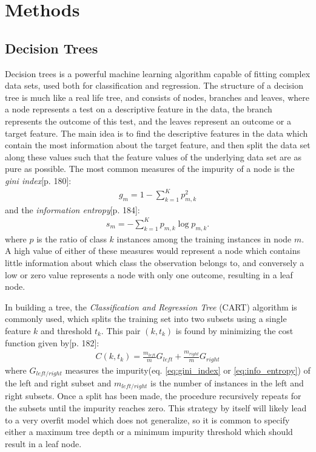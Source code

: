 \section{Methods}\label{sec:Methods}


\subsection{Decision Trees}
Decision trees is a powerful machine learning algorithm capable of fitting complex data sets, used both for classification and regression. The structure of a decision tree is much like a real life tree, and consists of nodes, branches and leaves, where a node represents a test on a descriptive feature in the data, the branch represents the outcome of this test, and the leaves represent an outcome or a target feature. The main idea is to find the descriptive features in the data which contain the most information about the target feature, and then split the data set along these values such that the feature values of the underlying data set are as pure as possible. The most common measures of the impurity of a node is the \textit{gini index}\cite{geron}[p. 180]:
\begin{align}
\label{eq:gini_index}
    g_m = 1 - \sum_{k=1}^K p_{m, k}^2
\end{align}
and the \textit{information entropy}\cite{geron}[p. 184]:
\begin{align}
\label{eq:info_entropy}
    s_m = - \sum_{k=1}^K p_{m, k}\log{p_{m,k}}.
\end{align}
where $p$ is the ratio of class $k$ instances among the training instances in node $m$. A high value of either of these measures would represent a node which contains little information about which class the observation belongs to, and conversely a low or zero value represents a node with only one outcome, resulting in a leaf node.

In building a tree, the \textit{Classification and Regression Tree} (CART) algorithm is commonly used, which splits the training set into two subsets using a single feature $k$ and threshold $t_k$. This pair $(k, t_k)$ is found by minimizing the cost function given by\cite{geron}[p. 182]:
\begin{align}
    C(k, t_k) = \frac{m_{left}}{m}G_{left} + \frac{m_{right}}{m}G_{right}
\end{align}
where $G_{left/right}$ measures the impurity(eq. \ref{eq:gini_index} or \ref{eq:info_entropy}) of the left and right subset and $m_{left/right}$ is the number of instances in the left and right subsets. Once a split has been made, the procedure recursively repeats for the subsets until the impurity reaches zero. This strategy by itself will likely lead to a very overfit model which does not generalize, so it is common to specify either a maximum tree depth or a minimum impurity threshold which should result in a leaf node.


